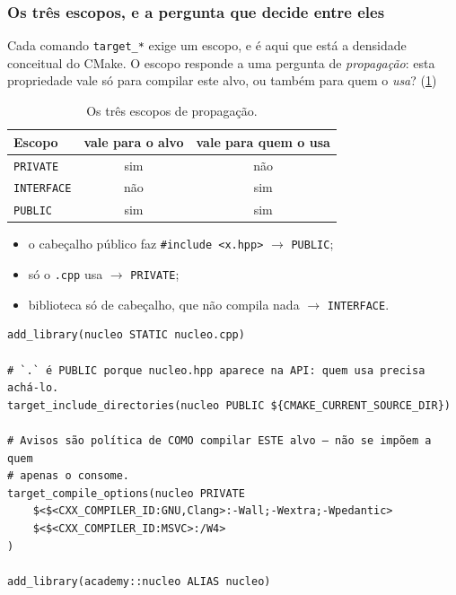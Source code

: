 \subsubsection{Os três escopos, e a pergunta que decide entre eles}

Cada comando \texttt{target\_*} exige um escopo, e é aqui que está a densidade
conceitual do CMake. O escopo responde a uma pergunta de \emph{propagação}:
esta propriedade vale só para compilar este alvo, ou também para quem o
\emph{usa}? (\cref{tab:cmake-escopos})

\begin{table}[htbp]
\centering
\caption{Os três escopos de propagação.}
\label{tab:cmake-escopos}
\footnotesize
\begin{tabular}{@{}lcc@{}}
\toprule
\textbf{Escopo} & \textbf{vale para o alvo} & \textbf{vale para quem o usa} \\
\midrule
\texttt{PRIVATE}   & sim & não \\
\texttt{INTERFACE} & não & sim \\
\texttt{PUBLIC}    & sim & sim \\
\bottomrule
\end{tabular}
\end{table}

\begin{regra}
\begin{itemize}
    \item o cabeçalho público faz \texttt{\#include <x.hpp>} $\rightarrow$ \texttt{PUBLIC};
    \item só o \texttt{.cpp} usa $\rightarrow$ \texttt{PRIVATE};
    \item biblioteca só de cabeçalho, que não compila nada $\rightarrow$ \texttt{INTERFACE}.
\end{itemize}
\end{regra}

\begin{lstlisting}[style=bt, language=Meson,
    morekeywords={add_library,add_executable,target_include_directories,
                  target_compile_options,target_link_libraries,STATIC,PUBLIC,
                  PRIVATE,INTERFACE,ALIAS},
    caption={O alvo \texttt{nucleo}, em \texttt{src/cmake/CMakeLists.txt}: o
             cabeçalho é público, os avisos são privados.}]
add_library(nucleo STATIC nucleo.cpp)

# `.` é PUBLIC porque nucleo.hpp aparece na API: quem usa precisa achá-lo.
target_include_directories(nucleo PUBLIC ${CMAKE_CURRENT_SOURCE_DIR})

# Avisos são política de COMO compilar ESTE alvo — não se impõem a quem
# apenas o consome.
target_compile_options(nucleo PRIVATE
    $<$<CXX_COMPILER_ID:GNU,Clang>:-Wall;-Wextra;-Wpedantic>
    $<$<CXX_COMPILER_ID:MSVC>:/W4>
)

add_library(academy::nucleo ALIAS nucleo)
\end{lstlisting}

